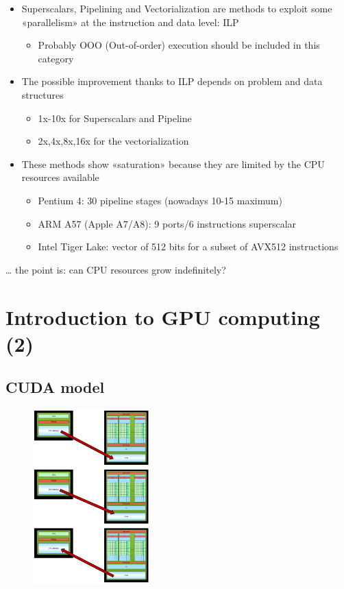 \vfill

\begin{tcolorbox}[width=\textwidth,colback={white},title={Summary: },colbacktitle=cyan,coltitle=black]
	\begin{itemize}
		\item Superscalars, Pipelining and Vectorialization are methods to exploit some «parallelism» at the instruction and data level: ILP
		\begin{itemize}
			\item Probably OOO (Out-of-order) execution should be included in this category
		\end{itemize}
		\item The possible improvement thanks to ILP depends on problem and data structures
		\begin{itemize}
			\item 1x-10x for Superscalars and Pipeline
			\item 2x,4x,8x,16x for the vectorialization
		\end{itemize}
		\item These methods show «saturation» because they are limited by the CPU resources available
		\begin{itemize}
			\item Pentium 4: 30 pipeline stages (nowadays 10-15 maximum)
			\item ARM A57 (Apple A7/A8): 9 ports/6 instructions superscalar
			\item Intel Tiger Lake: vector of 512 bits for a subset of AVX512 instructions
		\end{itemize}
	\end{itemize}  
	… the point is: can CPU resources grow indefinitely?
\end{tcolorbox}

\newpage
\clearpage

\section{Introduction to GPU computing (2)}
\subsection{CUDA model}


\begin{figure}[ht]
	\centering
	\includegraphics[width=0.4\textwidth]{figure_parallel/cuda.png}
\end{figure}
\FloatBarrier

